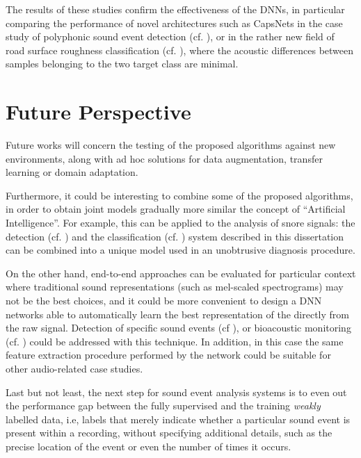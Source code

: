 The results of these studies confirm the effectiveness of the DNNs, in particular comparing the performance of novel architectures such as CapsNets in the case study of polyphonic sound event detection (cf. ), or in the rather new field of road surface roughness classification (cf. ), where the acoustic differences between samples belonging to the two target class are minimal.

\section{Future Perspective}

Future works will concern the testing of the proposed algorithms against new environments, along with ad hoc solutions for data augmentation, transfer learning or domain adaptation. 

Furthermore, it could be interesting to combine some of the proposed algorithms, in order to obtain joint models gradually more similar the concept of ``Artificial Intelligence''. For example, this can be applied to the analysis of snore signals: the detection (cf. ) and the classification (cf. ) system described in this dissertation can be combined into a unique model used in an unobtrusive diagnosis procedure. 

On the other hand, end-to-end approaches can be evaluated for particular context where traditional sound representations (such as mel-scaled spectrograms) may not be the best choices, and it could be more convenient to design a DNN networks able to automatically learn the best representation of the directly from the raw signal. Detection of specific sound events (cf ), or bioacoustic monitoring (cf. ) could be addressed with this technique.
In addition, in this case the same feature extraction
procedure performed by the network could be suitable for other audio-related
case studies.

Last but not least, the next step for sound event analysis systems is to even out the performance gap between the fully supervised and the training \textit{weakly} labelled data, i.e, labels that merely indicate
whether a particular sound event is present within a recording, without specifying
additional details, such as the precise location of the event or even the number of
times it occurs. 
